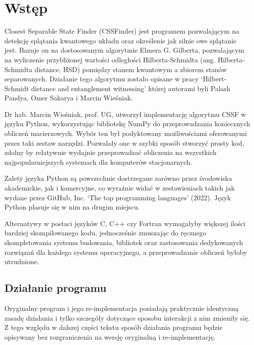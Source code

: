 \documentclass[11pt, a4paper]{article}
\begin{document}
  \begin{sloppypar}
    \section{Wstęp}
    Closest Separable State Finder (CSSFinder) jest programem pozwalającym na detekcję splątania
    kwantowego układu oraz określenie jak silnie owe splątanie jest. Bazuje on na
    dostosowanym algorytmie Elmera G. Gilberta\cite{Lindemann_Gilbert}, pozwalającym na wyliczenie
    przybliżonej wartości odległości Hilberta-Schmidta (ang. Hilberta-Schmidta distance,
    HSD) pomiędzy stanem kwantowym a zbiorem stanów separowanych. Działanie tego
    algorytmu zostało opisane w pracy `Hilbert-Schmidt distance and entanglement witnessing'
    której autorami byli Palash Pandya, Omer Sakarya i Marcin Wieśniak\cite{MW_Hilbert_Schmidt_distance}.

    Dr hab. Marcin Wieśniak, prof. UG, utworzył implementację algorytmu CSSF w języku
    Python, wykorzystując bibliotekę NumPy do przeprowadzania koniecznych obliczeń macierzowych.
    Wybór ten był podyktowany możliwościami oferowanymi przez taki zestaw narzędzi. Pozwalały
    one w szybki sposób stworzyć prosty kod, zdolny by relatywnie wydajnie przeprowadzać
    obliczenia na wszystkich najpopularniejszych systemach dla komputerów stacjonarnych.

    Zalety języka Python są powszechnie dostrzegane zarówno przez środowiska akademickie,
    jak i komercyjne, co wyraźnie widać w zestawieniach takich jak wydane przez GitHub, Inc.
    `The top programming languages' (2022)\cite{GitHub_Top_languages}. Język Python
    plasuje się w nim na drugim miejscu.

    Alternatywy w postaci języków C, C++ czy Fortran wymagałyby większej ilości bardziej
    skompilowanego kodu, jednocześnie zmuszając do ręcznego skompletowania systemu
    budowania, bibliotek oraz zastosowania dedykowanych rozwiązań dla każdego systemu operacyjnego,
    a przeprowadzanie obliczeń byłoby utrudnione.

    \subsection{Działanie programu}

    Oryginalny program i jego re-implementacja posiadają praktycznie identyczną zasadę działania
    i tylko szczegóły dotyczące sposobu interakcji z nim zmieniły się. Z tego względu w
    dalszej części tekstu sposób działania programu będzie opisywany bez rozgraniczenia
    na wersję oryginalną i re-implementację.


\end{sloppypar}
\end{document}
